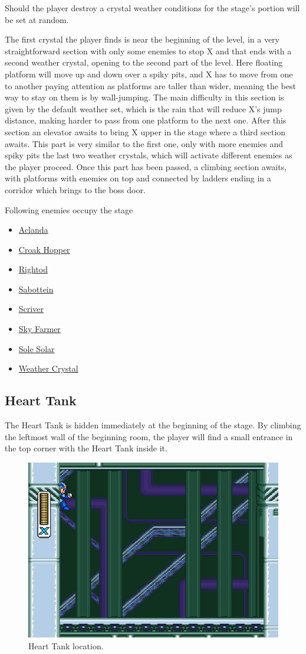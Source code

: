 Should the player destroy a crystal weather conditions for the stage's portion will be set at random.

The first crystal the player finds is near the beginning of the level, in a very straightforward section with only some enemies to stop X and that ends with a second weather crystal, opening to the second part of the level. Here floating platform will move up and down over a spiky pits, and X has to move from one to another paying attention as platforms are taller than wider, meaning the best way to stay on them is by wall-jumping. The main difficulty in this section is given by the default weather set, which is the rain that will reduce X's jump distance, making harder to pass from one platform to the next one. After this section an elevator awaits to bring X upper in the stage where a third section awaits. This part is very similar to the first one, only with more enemies and spiky pits the last two weather crystals, which will activate different enemies as the player proceed. Once this part has been passed, a climbing section awaits, with platforms with enemies on top and connected by ladders ending in a corridor which brings to the boss door.

Following enemies occupy the stage~\cite{wiki:weather_control}
\begin{itemize}
	\item \hyperlink{enem:Aclanda}{Aclanda}
	\item \hyperlink{enem:Croak_hopper}{Croak Hopper}
	\item \hyperlink{enem:Rightod}{Rightod}
	\item \hyperlink{enem:Sabottein}{Sabottein}
	\item \hyperlink{enem:Scriver}{Scriver}
	\item \hyperlink{enem:Sky_farmer}{Sky Farmer}
	\item \hyperlink{enem:Sole_solar}{Sole Solar}
	\item \hyperlink{enem:Weather_crystal}{Weather Crystal}
\end{itemize}

\subsection{Heart Tank}
The Heart Tank is hidden immediately at the beginning of the stage. By climbing the leftmost wall of the beginning room, the player will find a small entrance in the top corner with the Heart Tank inside it.
\begin{figure}[htp]
	\centering
	\includegraphics[width=0.5\linewidth]{figures/X2/Wire_sponge/Sponge_heart.jpg}
	\caption{Heart Tank location.}
\end{figure}

